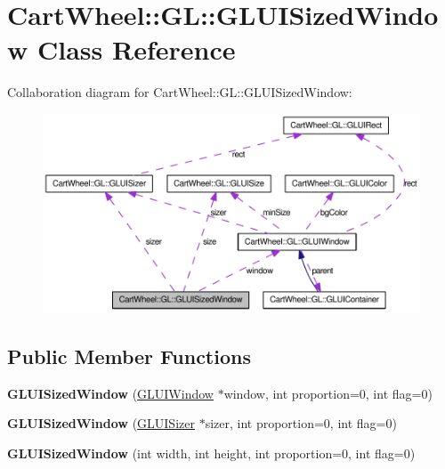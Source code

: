 \hypertarget{classCartWheel_1_1GL_1_1GLUISizedWindow}{
\section{CartWheel::GL::GLUISizedWindow Class Reference}
\label{classCartWheel_1_1GL_1_1GLUISizedWindow}
}


Collaboration diagram for CartWheel::GL::GLUISizedWindow:\nopagebreak
\begin{figure}[H]
\begin{center}
\leavevmode
\includegraphics[width=400pt]{classCartWheel_1_1GL_1_1GLUISizedWindow__coll__graph}
\end{center}
\end{figure}
\subsection*{Public Member Functions}
\begin{DoxyCompactItemize}
\item 
\hypertarget{classCartWheel_1_1GL_1_1GLUISizedWindow_ac3e26fa630e0fbfbfb092fd044a50e81}{
{\bfseries GLUISizedWindow} (\hyperlink{classCartWheel_1_1GL_1_1GLUIWindow}{GLUIWindow} $\ast$window, int proportion=0, int flag=0)}
\label{classCartWheel_1_1GL_1_1GLUISizedWindow_ac3e26fa630e0fbfbfb092fd044a50e81}

\item 
\hypertarget{classCartWheel_1_1GL_1_1GLUISizedWindow_a68aab357495b14393dd8d8b67d06cdab}{
{\bfseries GLUISizedWindow} (\hyperlink{classCartWheel_1_1GL_1_1GLUISizer}{GLUISizer} $\ast$sizer, int proportion=0, int flag=0)}
\label{classCartWheel_1_1GL_1_1GLUISizedWindow_a68aab357495b14393dd8d8b67d06cdab}

\item 
\hypertarget{classCartWheel_1_1GL_1_1GLUISizedWindow_a58f8f8503aa5d9ccd5df44cec7dc99fa}{
{\bfseries GLUISizedWindow} (int width, int height, int proportion=0, int flag=0)}
\label{classCartWheel_1_1GL_1_1GLUISizedWindow_a58f8f8503aa5d9ccd5df44cec7dc99fa}

\end{DoxyCompactItemize}

